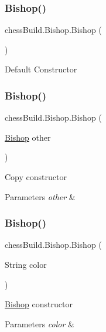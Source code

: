 \subsubsection{\texorpdfstring{Bishop()}{Bishop()}\hspace{0.1cm}{\footnotesize\ttfamily [1/4]}}
{\footnotesize\ttfamily chess\+Build.\+Bishop.\+Bishop (\begin{DoxyParamCaption}{ }\end{DoxyParamCaption})}

Default Constructor \mbox{\label{classchess_build_1_1_bishop_abd25029ee4ece2514a31704c77136eab}} 
\subsubsection{\texorpdfstring{Bishop()}{Bishop()}\hspace{0.1cm}{\footnotesize\ttfamily [2/4]}}
{\footnotesize\ttfamily chess\+Build.\+Bishop.\+Bishop (\begin{DoxyParamCaption}\item[{\hyperlink{classchess_build_1_1_bishop}{Bishop}}]{other }\end{DoxyParamCaption})}

Copy constructor 
\begin{DoxyParams}{Parameters}
{\em other} & \\
\hline
\end{DoxyParams}
\mbox{\label{classchess_build_1_1_bishop_a89d83da5ab8ceb0fc56b16684009631e}} 
\subsubsection{\texorpdfstring{Bishop()}{Bishop()}\hspace{0.1cm}{\footnotesize\ttfamily [3/4]}}
{\footnotesize\ttfamily chess\+Build.\+Bishop.\+Bishop (\begin{DoxyParamCaption}\item[{String}]{color }\end{DoxyParamCaption})}

\hyperlink{classchess_build_1_1_bishop}{Bishop} constructor 
\begin{DoxyParams}{Parameters}
{\em color} & \\
\hline
\end{DoxyParams}
\mbox{\label{classchess_build_1_1_bishop_a33e408253263931181c912a9addf6e2b}} 
